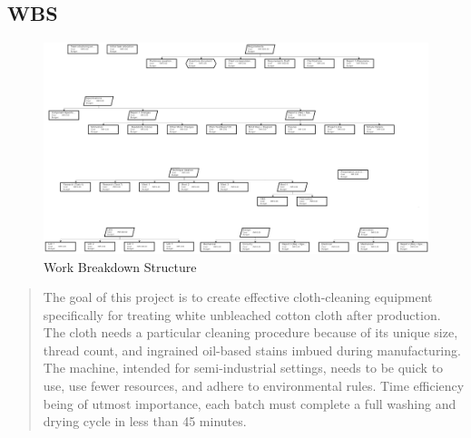 \documentclass[12pt]{article}
\begin{document}
\subsection{WBS}
    \begin{figure}[H]
        \centering
        \includegraphics[width=1.35\linewidth, angle=90]{Images/wbs1_1.jpg}
        \caption{Work Breakdown Structure}
        \label{fig:wbs}
    \end{figure}
\newpage
\begin{abstract}
The goal of this project is to create effective cloth-cleaning equipment specifically for treating white unbleached cotton cloth after production. The cloth needs a particular cleaning procedure because of its unique size, thread count, and ingrained oil-based stains imbued during manufacturing. The machine, intended for semi-industrial settings, needs to be quick to use, use fewer resources, and adhere to environmental rules. Time efficiency being of utmost importance, each batch must complete a full washing and drying cycle in less than 45 minutes.
\end{abstract}
\end{document}
